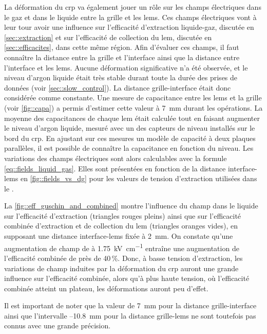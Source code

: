       La déformation du \gls{crp} va également jouer un rôle sur les champs électriques dans le gaz et dans le liquide entre la grille et les \glspl{lem}. Ces champs électriques vont à leur tour avoir une influence sur l'efficacité d'extraction liquide-gaz, discutée en \autoref{sec::extraction} et sur l'efficacité de collection du \gls{lem}, discutée en \autoref{sec::efficacites}, dans cette même région. Afin d'évaluer ces champs, il faut connaître la distance entre la grille et l'interface ainsi que la distance entre l'interface et les \glspl{lem}. Aucune déformation significative n'a été observée, et le niveau d'argon liquide était très stable durant toute la durée des prises de données (voir \autoref{sec::slow_control}). La distance grille-interface était donc considérée comme constante. Une mesure de capacitance entre les \glspl{lem} et la grille (voir \autoref{fig::capa}) a permis d'estimer cette valeur à \SI{7}{\milli\meter} durant les opérations. La moyenne des capacitances de chaque \gls{lem} était calculée tout en faisant augmenter le niveau d'argon liquide, mesuré avec un des capteurs de niveau installés sur le bord du \gls{crp}. En ajustant sur ces mesures un modèle de capacité à deux plaques parallèles, il est possible de connaître la capacitance en fonction du niveau. Les variations des champs électriques sont alors calculables avec la formule \eqref{eq::fields_liquid_gas}. Elles sont présentées en fonction de la distance interface-\glspl{lem} en \autoref{fig::fields_vs_dg} pour les valeurs de tension d'extraction utilisées dans le \TOO{}.

      La \autoref{fig::eff_guschin_and_combined} montre l'influence du champ dans le liquide sur l'efficacité d'extraction (triangles rouges pleins) ainsi que sur l'efficacité combinée d'extraction et de collection du \gls{lem} (triangles oranges vides), en supposant une distance interface-\glspl{lem} fixée à \SI{2}{\milli\meter}. On constate qu'une augmentation de champ de  à \SI{1.75}{\kilo\volt\per\centi\meter} entraîne une augmentation de l'efficacité combinée de près de 40\,\%. Donc, à basse tension d'extraction, les variations de champ induites par la déformation du \gls{crp} auront une grande influence sur l'efficacité combinée, alors qu'à plus haute tension, où l'efficacité combinée atteint un plateau, les déformations auront peu d'effet.

      Il est important de noter que la valeur de \SI{7}{\milli\meter} pour la distance grille-interface ainsi que l'intervalle --\SI{10.8}{\milli\meter} pour la distance grille-\glspl{lem} ne sont toutefois pas connus avec une grande précision.

